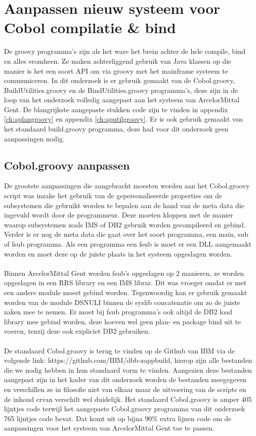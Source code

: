 \section{Aanpassen nieuw systeem voor Cobol compilatie \& bind}
De groovy programma's zijn als het ware het brein achter de hele compile, bind en alles eromheen. Ze maken achterliggend gebruik van Java klassen op die manier is het een soort API om via groovy met het mainframe systeem te communiceren. In dit onderzoek is er gebruik gemaakt van de Cobol.groovy, BuildUtilities.groovy en de BindUtilities.groovy programma's, deze zijn in de loop van het onderzoek volledig aangepast aan het systeem van ArcelorMittal Gent. De blangrijkste aangepaste stukken code zijn te vinden in appendix \ref{ch:aplangroovy} en appendix \ref{ch:aputilgroovy}. Er is ook gebruik gemaakt van het standaard build.groovy programma, deze had voor dit onderzoek geen aanpassingen nodig. 

\subsection{Cobol.groovy aanpassen}
\label{subsec:cobol.groovy aanpassen}
De grootste aanpassingen die aangebracht moesten worden aan het Cobol.groovy script was inzake het gebruik van de gepersonaliseerde properties om de subsystemen die gebruikt worden te bepalen aan de hand van de meta data die ingevuld wordt door de programmeur. Deze moeten kloppen met de manier waarop subsystemen zoals IMS of DB2 gebruik worden gecompileerd en gebind. Verder is er nog de meta data die gaat over het soort programma, een main, sub of fsub programma. Als een programma een fsub is moet er een DLL aangemaakt worden en moet deze op de juiste plaats in het systeem opgeslagen worden.
\\ \\
Binnen ArcelorMittal Gent worden fsub's opgeslagen op 2 manieren, ze worden opgeslagen in een RRS library en een IMS librar. Dit was vroeger omdat er met een andere module moest gebind worden. Tegenwoordig kan er gebruik gemaakt worden van de module DSNULI binnen de syslib concatenatie om zo de juiste zaken mee te nemen. Er moet bij fsub programma's ook altijd de DB2 load library mee gebind worden, deze hoeven wel geen plan- en package bind uit te voeren, tenzij deze ook expliciet DB2 gebruiken. 
\\ \\
De standaard Cobol.groovy is terug te vinden op de Github van IBM via de volgende link: https://github.com/IBM/dbb-zappbuild, hierop zijn alle bestanden die we nodig hebben in hun standaard vorm te vinden. Aangezien deze bestanden aangepast zijn in het kader van dit onderzoek worden de bestanden meegegeven en verschillen ze in filosofie niet van elkaar maar de uitvoering van de scripts en de inhoud ervan verschilt wel duidelijk. 
Het standaard Cobol.groovy is amper 405 lijntjes code terwijl het aangepaste Cobol.groovy programma van dit onderzoek 765 lijntjes code bevat. Dat komt uit op bijna 90\% extra lijnen code om de aanpassingen voor het systeem van ArcelorMittal Gent toe te passen.

